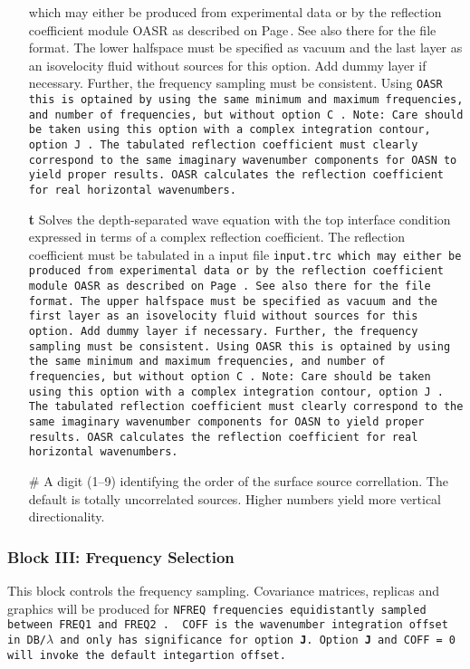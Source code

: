 \begin{itemize}
which may either be produced from experimental data or by the
reflection coefficient module OASR as described on
Page\,\pageref{trc-form}. See also there for the file format.
The lower halfspace must be specified as vacuum and the last layer as
an isovelocity fluid without sources for this option. Add dummy layer
if necessary. Further, the
frequency sampling must be consistent. 
Using \tt OASR \rm this is optained by using
the same minimum and maximum frequencies, and number of frequencies, but without option \tt C \rm.
Note: Care should be taken using this option with a complex
integration contour, option \tt J \rm. The tabulated reflection
coefficient must clearly correspond to the same imaginary wavenumber
components for \tt OASN \rm to yield proper results. \tt OASR \rm calculates
the reflection coefficient for real horizontal wavenumbers.
    \item[{\bf t}] Solves the depth-separated wave equation with the
top  interface condition expressed in terms of a complex
reflection coefficient. The reflection coefficient must be tabulated in a input file \tt input.trc \rm
which may either be produced from experimental data or by the
reflection coefficient module \tt OASR \rm as described on
Page\,\pageref{trc-form}. See also there for the file format.
The upper halfspace must be specified as vacuum and the first layer as
an isovelocity fluid without sources for this option. Add dummy layer
if necessary. Further, the
frequency sampling must be consistent. 
Using \tt OASR \rm this is optained by using the same minimum and 
maximum frequencies, and number of frequencies, but without option \tt C \rm.
Note: Care should be taken using this option with a complex
integration contour, option \tt J \rm. The tabulated reflection
coefficient must clearly correspond to the same imaginary wavenumber
components for \tt OASN \rm to yield proper results. \tt OASR \rm calculates
the reflection coefficient for real horizontal wavenumbers.
\item[\#] A digit (1--9) identifying the order of the surface source
correllation. The default is totally uncorrelated sources.
Higher numbers yield more vertical directionality.
\end{itemize}

\subsubsection{Block III: Frequency Selection}

This block controls the frequency sampling. Covariance matrices,
replicas and graphics will be produced for \tt NFREQ \rm frequencies
equidistantly sampled between \tt FREQ1 \rm and \tt FREQ2 \rm. \tt
COFF \rm is the wavenumber integration offset in DB/$\lambda$ and only
has significance for option {\bf J}. Option {\bf J} and \tt COFF = 0
\rm will invoke the default integartion offset.
 
